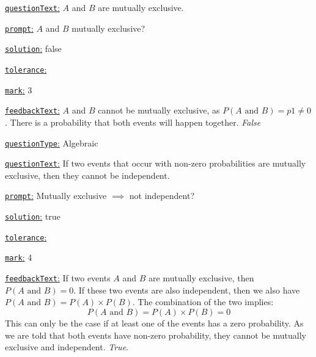 \documentclass[preview]{standalone}
\newcommand \fieldname[1]{\underline{\texttt{#1}:}}
\begin{document}
\fieldname{questionText}
$A$ and $B$ are mutually exclusive.

\fieldname{prompt}
$A$ and $B$ mutually exclusive?

\fieldname{solution}
false

\fieldname{tolerance}


\fieldname{mark}
3

\fieldname{feedbackText}
$A$ and $B$ cannot be mutually exclusive, as $P(A \textrm{ and } B) = {p1} \ne 0$. There is a probability that both events will happen together. \emph{False}

\fieldname{questionType}
Algebraic

\fieldname{questionText}
If two events that occur with non-zero probabilities are mutually exclusive, then they cannot be independent.

\fieldname{prompt}
Mutually exclusive $\implies$ not independent?

\fieldname{solution}
true

\fieldname{tolerance}


\fieldname{mark}
4

\fieldname{feedbackText}
If two events $A$ and $B$ are mutually exclusive, then $P(A \textrm{ and } B) = 0$. If these two events are also independent, then  we also have $P(A \textrm{ and } B) = P(A)\times P(B)$. The combination of the two implies:
\[
P(A \textrm{ and } B) = P(A)\times P(B) = 0
\]
This can only be the case if at least one of the events has a zero probability. As we are told that both events have non-zero probability, they cannot be mutually exclusive and independent. \emph{True}.

\end{document}
